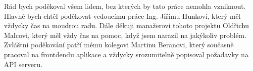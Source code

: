 Rád bych poděkoval všem lidem, bez kterých by tato práce nemohla vzniknout. Hlavně bych chtěl poděkovat vedoucímu práce Ing. Jiřímu Hunkovi, který měl vždycky čas na moudrou radu. Dále děkuji manažerovi tohoto projektu Oldřichu Malcovi, který měl vždy čas na pomoc, když jsem narazil na jakýkoliv problém. Zvláštní poděkování patří mému kolegovi Martinu Beranovi, který současně pracoval na frontdendu aplikace a vždycky srozumitelně popisoval požadavky na API serveru.